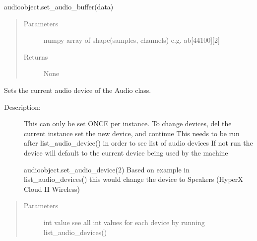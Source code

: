 \documentclass[letterpaper,10pt,english]{sphinxmanual}
\begin{document}
\begin{fulllineitems}
\begin{fulllineitems}
\begin{description}
\begin{description}
\sphinxAtStartPar
audioobject.set\_audio\_buffer(data)

\end{description}

\end{description}
\begin{quote}\begin{description}
\item[{Parameters}] \leavevmode
\sphinxAtStartPar
{} \textendash{} numpy array of shape(samples, channels) e.g. ab{[}44100{]}{[}2{]}

\item[{Returns}] \leavevmode
\sphinxAtStartPar
None

\end{description}\end{quote}

\end{fulllineitems}


\begin{fulllineitems}
\label{\detokenize{dpav:dpav.audio.Audio.set_audio_device}}
\sphinxAtStartPar
Sets the current audio device of the Audio class.
\begin{description}
\item[{Description:}] \leavevmode
\sphinxAtStartPar
This can only be set ONCE per instance. To change devices, del the current instance
set the new device, and continue
This needs to be run after list\_audio\_device() in order to see list of audio devices
If not run the device will default to the current device being used by the machine

\sphinxAtStartPar
audioobject.set\_audio\_device(2)
Based on example in list\_audio\_devices() this would change the device to Speakers (HyperX Cloud II Wireless)

\end{description}
\begin{quote}\begin{description}
\item[{Parameters}] \leavevmode
\sphinxAtStartPar
{} \textendash{} int value \sphinxhyphen{} see all int values for each device by running list\_audio\_devices()


\end{description}
\end{quote}
\end{fulllineitems}
\end{fulllineitems}
\end{document}
